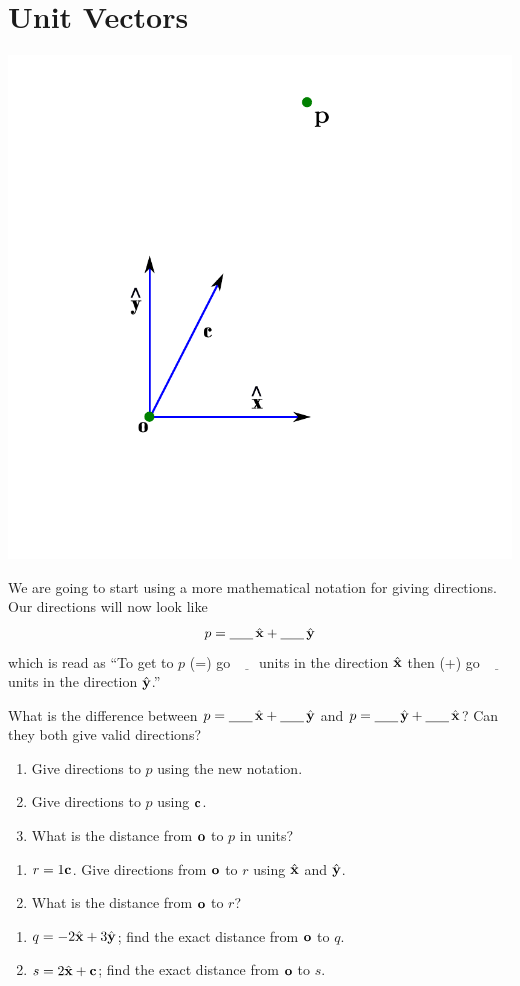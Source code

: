 \documentclass{article}
\newcommand{\ul}{$\underline{\phantom{xxx}}$}
\newcommand{\ull}{\underline{\phantom{xxx}}}
\newcommand{\xh}{\hat{\bf x}}
\newcommand{\yh}{\hat{\bf y}}
\begin{document}
\section*{Unit Vectors}
	\includegraphics{vectors-graphically-2.pdf}

	We are going to start using a more mathematical notation
	for giving directions.  Our directions will now look like
	\[
		p = \ull\, \xh + \ull\, \yh
	\]
	which is read as ``To get to $p$ (=) go \ul units in the direction $\xh$ then (+) go \ul units in 
	the direction $\yh$.''

	\begin{Enum}
		\item What is the difference between $p = \ull\, \xh + \ull\, \yh$ and $p = \ull\, \yh + \ull\, \xh$?
		Can they both give valid directions?
		\item
		\begin{enumerate}
			\item Give directions to $p$ using the new notation. 
			\item Give directions to $p$ using $\bf c$.
			\item What is the distance from $\bf o$ to $p$ in units?
		\end{enumerate}
		\item
		\begin{enumerate}
			\item $r=1\bf c$.  Give directions from $\bf o$ to $r$ using $\xh$ and $\yh$.
			\item What is the distance from $\bf o$ to $r$?
		\end{enumerate}
		\item
		\begin{enumerate}
			\item $q=-2\xh+3\yh$; find the exact distance from $\bf o$ to $q$.
			\item $s=2\xh+\bf c$; find the exact distance from $\bf o$ to $s$.
		\end{enumerate}
	\end{Enum}
\end{document}
